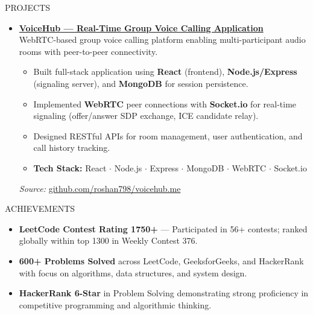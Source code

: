 \documentclass{resume} %
\begin{document}
\begin{rSection}{PROJECTS}
\begin{itemize}
        \item \href{https://github.com/roshan798/voicehub.me}{\textbf{VoiceHub --- Real-Time Group Voice Calling Application}}\\
              WebRTC-based group voice calling platform enabling multi-participant audio rooms with peer-to-peer connectivity.
              \begin{itemize}
                  \itemsep -3pt
                  \item Built full-stack application using \textbf{React} (frontend),
                        \textbf{Node.js/Express} (signaling server), and \textbf{MongoDB} for session
                        persistence.
                  \item Implemented \textbf{WebRTC} peer connections with \textbf{Socket.io} for
                        real-time signaling (offer/answer SDP exchange, ICE candidate relay).
                  \item Designed RESTful APIs for room management, user authentication, and call
                        history tracking.
                  \item \textbf{Tech Stack:} React $\cdot$ Node.js $\cdot$ Express $\cdot$ MongoDB $\cdot$ WebRTC $\cdot$ Socket.io
              \end{itemize}
              \textit{Source:} \href{https://github.com/roshan798/voicehub.me}{github.com/roshan798/voicehub.me}

    \end{itemize}
\end{rSection}

\begin{rSection}{ACHIEVEMENTS}
    \vspace{-0.3em}
    \begin{itemize}
        \itemsep -2pt
        \item \textbf{LeetCode Contest Rating 1750+} --- Participated in 56+ contests; ranked globally within top 1300 in Weekly Contest 376.
        \item \textbf{600+ Problems Solved} across LeetCode, GeeksforGeeks, and HackerRank with focus on algorithms, data structures, and system design.
        \item \textbf{HackerRank 6-Star} in Problem Solving demonstrating strong proficiency in competitive programming and algorithmic thinking.
    \end{itemize}
\end{rSection}
\end{document}
